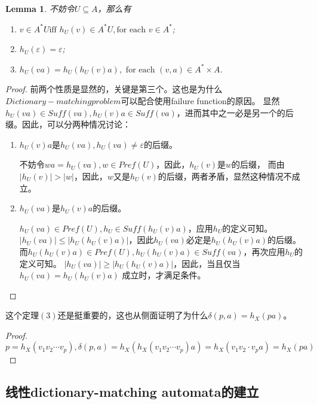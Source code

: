 \documentclass[UTF8]{ctexart}
\newtheorem{lem}[thm]{Lemma}
\theoremstyle{definition}
\theoremstyle{remark}
\numberwithin{equation}{subsection}
\newcommand{\Suff}{\textit{Suff}}
\begin{document}
	\begin{lem}
		不妨令$U \subseteq A$，那么有
		\begin{enumerate}[(1)]
			\item $v \in A^*U \text{iff } h_U(v) \in A^*U, \text{for each } v \in A^*$;
			\item $h_U(\varepsilon) = \varepsilon$;
			\item $h_U(va) = h_U(h_U(v)a), \text{ for each } (v, a) \in A^* \times A$.
		\end{enumerate}
	\end{lem}
	\begin{proof}
		前两个性质是显然的，关键是第三个。这也是为什么$Dictionary-matching problem$可以配合使用failure function的原因。
		显然$h_U(va) \in \Suff(va), h_U(v)a \in \Suff(va)$，进而其中之一必是另一个的后缀。因此，可以分两种情况讨论：
		\begin{enumerate}[(1)]
			\item $h_U(v)a$是$h_U(va), h_U(va) \neq \varepsilon$的后缀。
			
			不妨令$wa = h_U(va), w \in Pref(U)$，因此，$h_U(v)$是$w$的后缀，
			而由$|h_U(v)| > |w|$，因此，$w$又是$h_U(v)$的后缀，两者矛盾，显然这种情况不成立。
			
			\item $h_U(va)$是$h_U(v)a$的后缀。
			
			$h_U(va) \in Pref(U), h_U \in \Suff(h_U(v)a)$，应用$h_U$的定义可知。
			$|h_U(va)| \le |h_U(h_U(v)a)|$，因此$h_U(va)$必定是$h_U(h_U(v)a)$的后缀。
			而$h_U(h_U(v)a) \in Pref(U), h_U(h_U(v)a) \in \Suff(va)$，再次应用$h_U$的定义可知。
			$|h_U(va)| \ge |h_U(h_U(v)a)|$，因此，当且仅当$h_U(va) = h_U(h_U(v)a)$ 成立时，才满足条件。
			
		\end{enumerate}
	\end{proof}

	这个定理$(3)$还是挺重要的，这也从侧面证明了为什么$\delta(p,a)=h_X(pa)$。
	\begin{proof}
		$p = h_X(v_1v_2 \cdots v_p), \delta(p, a) = h_X(h_X(v_1v_2 \cdots v_p)a) = h_X(v_1v_2 \cdot v_p a)=h_X(pa)$
	\end{proof}
	
\subsection{线性dictionary-matching automata的建立}
	
\end{document}
